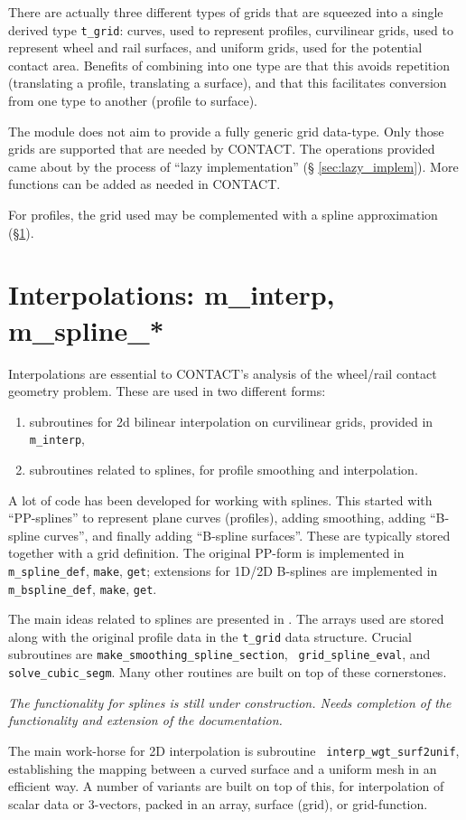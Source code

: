 \documentclass[12pt]{report}
\begin{document}
There are actually three different types of grids that are squeezed into a
single derived type {\tt t\_grid}: curves, used to represent profiles,
curvilinear grids, used to represent wheel and rail surfaces, and uniform
grids, used for the potential contact area. Benefits of combining into one
type are that this avoids repetition (translating a profile, translating a
surface), and that this facilitates conversion from one type to another
(profile to surface).

The module does not aim to provide a fully generic grid data-type. Only
those grids are supported that are needed by CONTACT. The operations
provided came about by the process of ``lazy implementation'' (\S 
\ref{sec:lazy_implem}). More functions can be added as needed in CONTACT.

For profiles, the grid used may be complemented with a spline
approximation (\S \ref{sec:m_interp}).

\section{Interpolations: m\_interp, m\_spline\_*}
\label{sec:m_interp}

Interpolations are essential to CONTACT's analysis of the wheel/rail
contact geometry problem. These are used in two different forms: 
\begin{enumerate}
\item subroutines for 2d bilinear interpolation on curvilinear grids,
        provided in {\tt m\_interp},
\item subroutines related to splines, for profile smoothing and
        interpolation.
\end{enumerate}
A lot of code has been developed for working with splines. This started
with ``PP-splines'' to represent plane curves (profiles), adding smoothing,
adding ``B-spline curves'', and finally adding ``B-spline surfaces''.
These are typically stored together with a grid definition. The original
PP-form is implemented in {\tt m\_spline\_def}, {\tt make}, {\tt get};
extensions for 1D/2D B-splines are implemented in {\tt m\_bspline\_def},
{\tt make}, {\tt get}.

The main ideas related to splines are presented in
\cite{Vollebregt2020b-wrgeom}. The arrays used are stored along with the
original profile data in the {\tt t\_grid} data structure. Crucial
subroutines are {\tt make\_smoothing\_spline\_\-section}, {\tt
grid\_spline\_eval}, and {\tt solve\_cubic\_segm}. Many other routines are
built on top of these cornerstones.

{\em The functionality for splines is still under construction. Needs
completion of the functionality and extension of the documentation.}

The main work-horse for 2D interpolation is subroutine {\tt
interp\_wgt\_surf2unif}, establishing the mapping between a curved surface
and a uniform mesh in an efficient way. A number of variants are built on
top of this, for interpolation of scalar data or 3-vectors, packed in an
array, surface (grid), or grid-function. 



\end{document}
